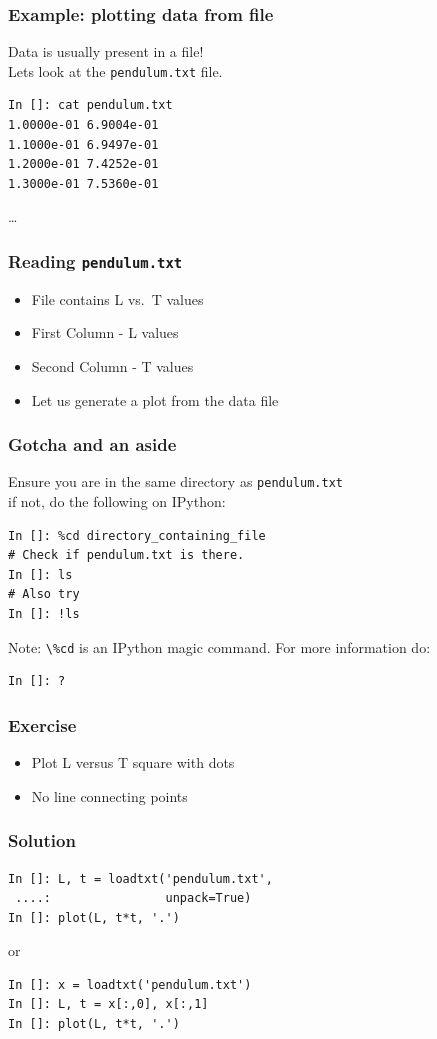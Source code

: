 \documentclass[14pt,compress]{beamer}
\newcommand{\typ}[1]{\lstinline{#1}}
\begin{document}
\begin{frame}[fragile]
\frametitle{Example: plotting data from file}
\alert{Data is usually present in a file!} \\
Lets look at the \typ{pendulum.txt} file.
\begin{lstlisting}
In []: cat pendulum.txt
1.0000e-01 6.9004e-01
1.1000e-01 6.9497e-01
1.2000e-01 7.4252e-01
1.3000e-01 7.5360e-01
\end{lstlisting}
\ldots
\end{frame}

\begin{frame}[fragile]
\frametitle{Reading \typ{pendulum.txt}}
\begin{itemize}
  \item File contains L vs.\ T values
  \item First Column - L values
  \item Second Column - T values
  \item Let us generate a plot from the data file
\end{itemize}
\end{frame}

\begin{frame}[fragile]
    \frametitle{Gotcha and an aside}
    Ensure you are in the same directory as \typ{pendulum.txt}\\
    if not, do the following on IPython:
    \begin{lstlisting}
In []: %cd directory_containing_file
# Check if pendulum.txt is there.
In []: ls
# Also try
In []: !ls
    \end{lstlisting}

    \alert{Note:} \typ{\%cd} is an IPython magic command.  For more information
    do:
    \begin{lstlisting}
In []: ?
    \end{lstlisting}
\end{frame}


\begin{frame}[fragile]
    \frametitle{Exercise}
    \begin{itemize}
        \item Plot L versus T square with dots
        \item No line connecting points
    \end{itemize}
\end{frame}

\begin{frame}[fragile]
\frametitle{Solution}
\begin{lstlisting}
In []: L, t = loadtxt('pendulum.txt',
 ....:                unpack=True)
In []: plot(L, t*t, '.')
\end{lstlisting}
or
\begin{lstlisting}
In []: x = loadtxt('pendulum.txt')
In []: L, t = x[:,0], x[:,1]
In []: plot(L, t*t, '.')
\end{lstlisting}

\end{frame}
\end{document}

